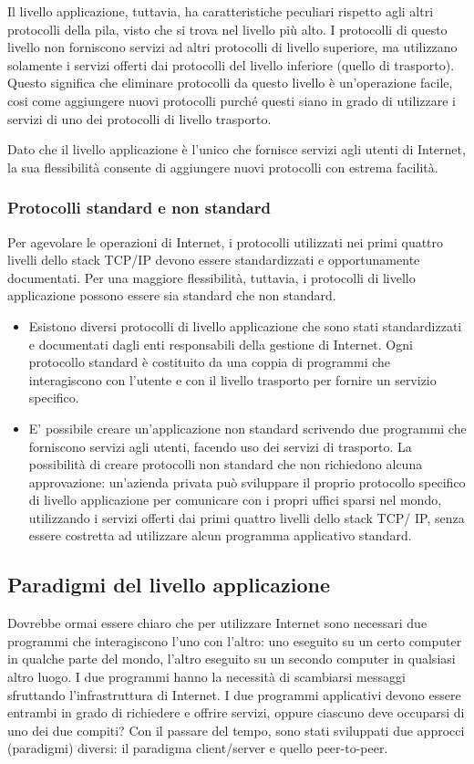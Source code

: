 Il livello applicazione, tuttavia, ha caratteristiche peculiari rispetto agli altri protocolli della pila, visto che si trova nel livello più alto. I protocolli di questo livello non forniscono servizi ad altri protocolli di livello superiore, ma utilizzano solamente i servizi offerti dai protocolli del livello inferiore (quello di trasporto). Questo significa che eliminare protocolli da questo livello è un'operazione facile, cosi come aggiungere nuovi protocolli purché questi siano in grado di utilizzare i servizi di uno dei protocolli di livello trasporto.

Dato che il livello applicazione è l'unico che fornisce servizi agli utenti di Internet, la sua flessibilità consente di aggiungere nuovi protocolli con estrema facilità.

\subsubsection*{Protocolli standard e non standard}

Per agevolare le operazioni di Internet, i protocolli utilizzati nei primi quattro livelli dello stack TCP/IP devono essere standardizzati e opportunamente documentati. Per una maggiore flessibilità, tuttavia, i protocolli di livello applicazione possono essere sia standard che non standard.

\begin{itemize}
    \item Esistono diversi protocolli di livello applicazione che sono stati standardizzati e documentati dagli enti responsabili della gestione di Internet. Ogni protocollo standard è costituito da una coppia di programmi che interagiscono con l'utente e con il livello trasporto per fornire un servizio specifico.
    \item E' possibile creare un'applicazione non standard scrivendo due programmi che forniscono servizi agli utenti, facendo uso dei servizi di trasporto. La possibilità di creare protocolli non standard che non richiedono alcuna approvazione: un'azienda privata può sviluppare il proprio protocollo specifico di livello applicazione per comunicare con i propri uffici sparsi nel mondo, utilizzando i servizi offerti dai primi quattro livelli dello stack TCP/ IP, senza essere costretta ad utilizzare alcun programma applicativo standard.
\end{itemize}

\subsection{Paradigmi del livello applicazione}
Dovrebbe ormai essere chiaro che per utilizzare Internet sono necessari due programmi che interagiscono l'uno con l'altro: uno eseguito su un certo computer in qualche parte del mondo, l'altro eseguito su un secondo computer in qualsiasi altro luogo. I due programmi hanno la necessità di scambiarsi messaggi sfruttando l'infrastruttura di Internet. I due programmi applicativi devono essere entrambi in grado di richiedere e offrire servizi, oppure ciascuno deve occuparsi di uno dei due compiti? Con il passare del tempo, sono stati sviluppati due approcci (paradigmi) diversi: il paradigma client/server e quello peer-to-peer.

